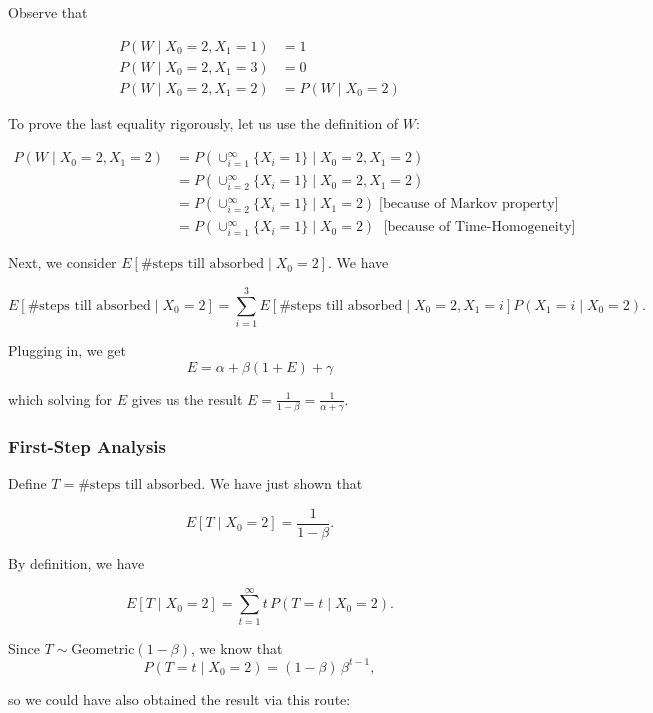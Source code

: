 \documentclass{article}
\theoremstyle{definition}
\begin{document}
Observe that

\begin{align*}
 P(W \mid X_0 = 2, X_1 = 1) &= 1 \\
 P(W \mid X_0 = 2, X_1 = 3) &= 0 \\
  P(W \mid X_0 = 2, X_1 = 2) &=  P(W \mid X_0 = 2)
\end{align*}

To prove the last equality rigorously, let us use the definition of $W$:

\begin{align*}
  P(W \mid X_0 = 2, X_1 = 2) &=
  P \left( \cup_{i=1}^\infty \{X_i = 1\}  \mid X_0 = 2, X_1 = 2 \right) \\
  &=  P \left( \cup_{i=2}^\infty \{X_i = 1\} \mid X_0 = 2, X_1 = 2 \right) \\
  &= P \left( \cup_{i=2}^\infty \{X_i = 1\} \mid X_1 = 2 \right ) \; \text{[because of Markov property]} \\
    &= P \left( \cup_{i=1}^\infty \{X_i = 1\} \mid X_0 = 2 \right) \; \text{ [because of Time-Homogeneity] }
\end{align*}

Next, we consider $E \left[ \text{\# steps till absorbed} \mid X_0 = 2 \right]$. We have

$$
E \left[ \text{\# steps till absorbed} \mid X_0 = 2 \right] = \sum_{i=1}^3 E \left[ \text{\# steps till absorbed} \mid X_0 = 2, X_1 = i \right] P(X_1 = i \mid X_0 = 2).
$$

Plugging in, we get
$$
E = \alpha + \beta (1 + E) + \gamma
$$

which solving for $E$ gives us the result $E= \frac{1}{1-\beta} = \frac{1}{\alpha + \gamma}$.

\subsubsection*{First-Step Analysis}
Define $T = \text{\# steps till absorbed}$. We have just shown that

$$
E\left[T \mid X_0 = 2 \right] =  \frac{1}{1-\beta}.
$$

By definition, we have

$$
E\left[T \mid X_0 = 2 \right] = \sum_{t=1}^\infty t \, P(T=t\mid X_0 = 2).
$$

Since $T \sim \text{Geometric}(1-\beta)$, we know that
$$
P(T=t\mid X_0 = 2) = (1 - \beta)\,\beta^{t-1},
$$

so we could have also obtained the result via this route:
\end{document}
